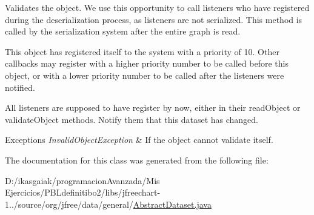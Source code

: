 Validates the object. We use this opportunity to call listeners who have registered during the deserialization process, as listeners are not serialized. This method is called by the serialization system after the entire graph is read.

This object has registered itself to the system with a priority of 10. Other callbacks may register with a higher priority number to be called before this object, or with a lower priority number to be called after the listeners were notified.

All listeners are supposed to have register by now, either in their read\+Object or validate\+Object methods. Notify them that this dataset has changed.


\begin{DoxyExceptions}{Exceptions}
{\em Invalid\+Object\+Exception} & If the object cannot validate itself. \\
\hline
\end{DoxyExceptions}


The documentation for this class was generated from the following file\+:\begin{DoxyCompactItemize}
\item 
D\+:/ikasgaiak/programacion\+Avanzada/\+Mis Ejercicios/\+P\+B\+Ldefinitibo2/libs/jfreechart-\/1../source/org/jfree/data/general/\mbox{\hyperlink{_abstract_dataset_8java}{Abstract\+Dataset.\+java}}\end{DoxyCompactItemize}

